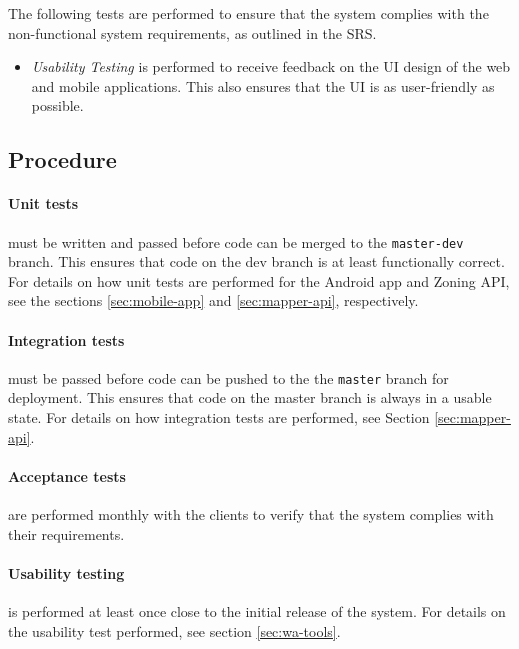 \documentclass{article}
\begin{document}
    The following tests are performed to ensure that the system complies with
    the non-functional system requirements, as outlined in the SRS.

    \begin{itemize}
        \item \textit{Usability Testing} is performed to receive feedback on
            the UI design of the web and mobile applications. This also ensures
            that the UI is as user-friendly as possible.
    \end{itemize}

    \subsection{Procedure}
    \label{sec:procedure}

    \paragraph{Unit tests} must be written and passed before code can be merged
    to the \texttt{master-dev} branch. This ensures that code on the dev branch
    is at least functionally correct. For details on how unit tests are
    performed for the Android app and Zoning API, see the sections
    \ref{sec:mobile-app} and \ref{sec:mapper-api}, respectively.

    \paragraph{Integration tests} must be passed before code can be pushed to
    the the \texttt{master} branch for deployment. This ensures that code on
    the master branch is always in a usable state. For details on how
    integration tests are performed, see Section \ref{sec:mapper-api}.

    \paragraph{Acceptance tests} are performed monthly with the clients to
    verify that the system complies with their requirements.

    \paragraph{Usability testing} is performed at least once close to the
    initial release of the system. For details on the usability test performed,
    see section \ref{sec:wa-tools}.
\end{document}
